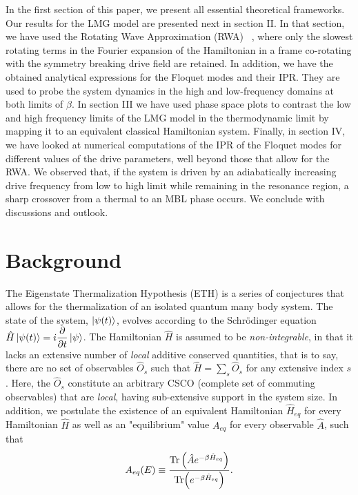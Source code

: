\documentclass[%
reprint,
superscriptaddress,
amsmath,amssymb,
aps,
prb,
showkeys,
]{revtex4-2}
\begin{document}
	In the first section of this paper, we present all essential theoretical frameworks. Our results for the LMG model are presented next in section II. In that section, we have used the Rotating Wave Approximation (RWA) ~\cite{fujii_introduction_2017}, where only the slowest rotating terms in the Fourier expansion of the Hamiltonian in a frame co-rotating with the symmetry breaking drive field are retained. In addition, we have the obtained analytical expressions for the Floquet modes and their IPR. They are used to probe the system dynamics in the high and low-frequency domains at both limits of $\beta$. In section III we have used phase space plots to contrast the low and high frequency limits of the LMG model in the thermodynamic limit by mapping it to an equivalent classical Hamiltonian system. Finally, in section IV, we have looked at numerical computations of the IPR of the Floquet modes for different values of the drive parameters, well beyond those that allow for the RWA. We observed that, if the system is driven by an adiabatically increasing drive frequency from low to high limit while remaining in the resonance region, a sharp crossover from a thermal to an MBL phase occurs. We conclude with discussions and outlook.
	
\section{\label{sec:background} Background}
	
The Eigenstate Thermalization Hypothesis (ETH) is a series of conjectures that allows for the thermalization of an isolated quantum many body system. The state of the system, $\ket{\psi(t)}$, evolves according to the Schr\"odinger equation $\hat{H}\ket{\psi(t)} = i\displaystyle\frac{\partial}{\partial t}\ket{\psi}$. The Hamiltonian $\hat{H}$ is assumed to be \textit{non-integrable}, in that it lacks an extensive number of \textit{local} additive conserved quantities, that is to say, there are no set of observables $\hat{O}_s$ such that $\hat{H}=\sum_s \hat{O}_s$ for any extensive index $s$. Here, the $\hat{O}_s$ constitute an arbitrary CSCO (complete set of commuting observables) that are \textit{local}, having sub-extensive support in the system size. In addition, we postulate the existence of an equivalent Hamiltonian $\hat{H}_{eq}$ for every Hamiltonian $\hat{H}$ as well as an "equilibrium" value $A_{eq}$ for every observable $\hat{A}$, such that
\begin{equation}
	\label{eq:aeq}
 A_{eq}(E)\equiv \frac{\Tr \left(\hat{A}e^{-\beta \hat{H}_{eq}}\right)}{\Tr(e^{-\beta \hat{H}_{eq}})}.
\end{equation}
\end{document}
